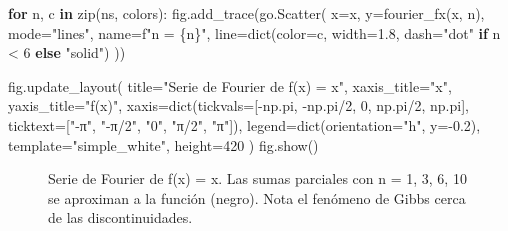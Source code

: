 \documentclass[
  letterpaper,
  DIV=11,
  numbers=noendperiod]{scrreprt}
\newenvironment{Shaded}{\begin{snugshade}}{\end{snugshade}}
\newcommand{\BuiltInTok}[1]{\textcolor[rgb]{0.00,0.23,0.31}{#1}}
\newcommand{\ControlFlowTok}[1]{\textcolor[rgb]{0.00,0.23,0.31}{\textbf{#1}}}
\newcommand{\DecValTok}[1]{\textcolor[rgb]{0.68,0.00,0.00}{#1}}
\newcommand{\FloatTok}[1]{\textcolor[rgb]{0.68,0.00,0.00}{#1}}
\newcommand{\KeywordTok}[1]{\textcolor[rgb]{0.00,0.23,0.31}{\textbf{#1}}}
\newcommand{\NormalTok}[1]{\textcolor[rgb]{0.00,0.23,0.31}{#1}}
\newcommand{\OperatorTok}[1]{\textcolor[rgb]{0.37,0.37,0.37}{#1}}
\newcommand{\SpecialCharTok}[1]{\textcolor[rgb]{0.37,0.37,0.37}{#1}}
\newcommand{\SpecialStringTok}[1]{\textcolor[rgb]{0.13,0.47,0.30}{#1}}
\newcommand{\StringTok}[1]{\textcolor[rgb]{0.13,0.47,0.30}{#1}}
\begin{document}
\begin{Shaded}
\begin{Highlighting}[]
\ControlFlowTok{for}\NormalTok{ n, c }\KeywordTok{in} \BuiltInTok{zip}\NormalTok{(ns, colors):}
\NormalTok{    fig.add\_trace(go.Scatter(}
\NormalTok{        x}\OperatorTok{=}\NormalTok{x, y}\OperatorTok{=}\NormalTok{fourier\_fx(x, n),}
\NormalTok{        mode}\OperatorTok{=}\StringTok{"lines"}\NormalTok{, name}\OperatorTok{=}\SpecialStringTok{f"n = }\SpecialCharTok{\{}\NormalTok{n}\SpecialCharTok{\}}\SpecialStringTok{"}\NormalTok{,}
\NormalTok{        line}\OperatorTok{=}\BuiltInTok{dict}\NormalTok{(color}\OperatorTok{=}\NormalTok{c, width}\OperatorTok{=}\FloatTok{1.8}\NormalTok{, dash}\OperatorTok{=}\StringTok{"dot"} \ControlFlowTok{if}\NormalTok{ n }\OperatorTok{\textless{}} \DecValTok{6} \ControlFlowTok{else} \StringTok{"solid"}\NormalTok{)}
\NormalTok{    ))}

\NormalTok{fig.update\_layout(}
\NormalTok{    title}\OperatorTok{=}\StringTok{"Serie de Fourier de f(x) = x"}\NormalTok{,}
\NormalTok{    xaxis\_title}\OperatorTok{=}\StringTok{"x"}\NormalTok{,}
\NormalTok{    yaxis\_title}\OperatorTok{=}\StringTok{"f(x)"}\NormalTok{,}
\NormalTok{    xaxis}\OperatorTok{=}\BuiltInTok{dict}\NormalTok{(tickvals}\OperatorTok{=}\NormalTok{[}\OperatorTok{{-}}\NormalTok{np.pi, }\OperatorTok{{-}}\NormalTok{np.pi}\OperatorTok{/}\DecValTok{2}\NormalTok{, }\DecValTok{0}\NormalTok{, np.pi}\OperatorTok{/}\DecValTok{2}\NormalTok{, np.pi],}
\NormalTok{               ticktext}\OperatorTok{=}\NormalTok{[}\StringTok{"{-}π"}\NormalTok{, }\StringTok{"{-}π/2"}\NormalTok{, }\StringTok{"0"}\NormalTok{, }\StringTok{"π/2"}\NormalTok{, }\StringTok{"π"}\NormalTok{]),}
\NormalTok{    legend}\OperatorTok{=}\BuiltInTok{dict}\NormalTok{(orientation}\OperatorTok{=}\StringTok{"h"}\NormalTok{, y}\OperatorTok{={-}}\FloatTok{0.2}\NormalTok{),}
\NormalTok{    template}\OperatorTok{=}\StringTok{"simple\_white"}\NormalTok{,}
\NormalTok{    height}\OperatorTok{=}\DecValTok{420}
\NormalTok{)}
\NormalTok{fig.show()}
\end{Highlighting}
\end{Shaded}

\begin{figure}


\caption{\label{fig-ej-a}Serie de Fourier de f(x) = x. Las sumas
parciales con n = 1, 3, 6, 10 se aproximan a la función (negro). Nota el
fenómeno de Gibbs cerca de las discontinuidades.}

\end{figure}%
\end{document}
